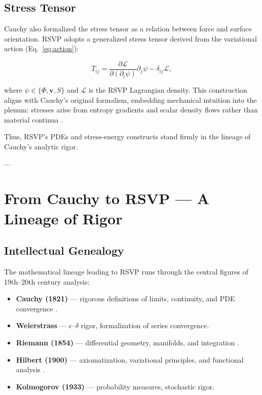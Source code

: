 \documentclass[12pt]{report}
\begin{document}
\section{Stress Tensor}

Cauchy also formalized the stress tensor as a relation between force and surface orientation. RSVP adopts a generalized stress tensor derived from the variational action (Eq.~\eqref{eq:action}):

\begin{equation}
T_{ij} = \frac{\partial \mathcal{L}}{\partial (\partial_i \psi)} \partial_j \psi - \delta_{ij} \mathcal{L},
\end{equation}

where $\psi \in \{\Phi,\mathbf{v},S\}$ and $\mathcal{L}$ is the RSVP Lagrangian density.  
This construction aligns with Cauchy’s original formalism, embedding mechanical intuition into the plenum: stresses arise from entropy gradients and scalar density flows rather than material continua \citep{RSVPMeta2025}.

\bigskip
Thus, RSVP’s PDEs and stress-energy constructs stand firmly in the lineage of Cauchy’s analytic rigor.

---

\chapter{From Cauchy to RSVP --- A Lineage of Rigor}
\label{app:Y}

\section{Intellectual Genealogy}

The mathematical lineage leading to RSVP runs through the central figures of 19th–20th century analysis:

\begin{itemize}
    \item \textbf{Cauchy (1821)} — rigorous definitions of limits, continuity, and PDE convergence \citep{Cauchy1821}.  
    \item \textbf{Weierstrass} — $\epsilon$--$\delta$ rigor, formalization of series convergence.  
    \item \textbf{Riemann (1854)} — differential geometry, manifolds, and integration \citep{Riemann1854}.  
    \item \textbf{Hilbert (1900)} — axiomatization, variational principles, and functional analysis \citep{Hilbert1900}.  
    \item \textbf{Kolmogorov (1933)} — probability measures, stochastic rigor.  
\end{itemize}
\end{document}
